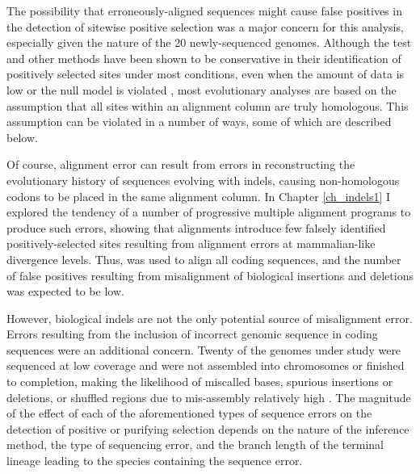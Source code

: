 The possibility that erroneously-aligned sequences might cause false
positives in the detection of sitewise positive selection was a major
concern for this analysis, especially given the \lcv nature of the 20
newly-sequenced genomes. Although the \slr test and other \sw \ml
methods have been shown to be conservative in their identification of
positively selected sites under most conditions, even when the amount
of data is low or the null model is violated
\citep{Anisimova2002,Anisimova2003,Massingham2005}, most evolutionary
analyses are based on the assumption that all sites within an
alignment column are truly homologous. This assumption can be violated
in a number of ways, some of which are described below.

Of course, alignment error can result from errors in reconstructing
the evolutionary history of sequences evolving with indels, causing
non-homologous codons to be placed in the same alignment column. In
Chapter \ref{ch_indels1} I explored the tendency of a number of
progressive multiple alignment programs to produce such errors,
showing that \prankc alignments introduce few falsely identified
positively-selected sites resulting from alignment errors at
mammalian-like divergence levels. Thus, \prankc was used to align all
coding sequences, and the number of false positives resulting from
misalignment of biological insertions and deletions was expected to be
low.

However, biological indels are not the only potential source of
misalignment error. Errors resulting from the inclusion of incorrect
genomic sequence in coding sequences were an additional
concern. Twenty of the genomes under study were sequenced at low
coverage and were not assembled into chromosomes or finished to
completion, making the likelihood of miscalled bases, spurious
insertions or deletions, or shuffled regions due to mis-assembly
relatively high \citep{Green2007}. The magnitude of the effect of each
of the aforementioned types of sequence errors on the detection of
positive or purifying selection depends on the nature of the inference
method, the type of sequencing error, and the branch length of the
terminal lineage leading to the species containing the sequence error.

